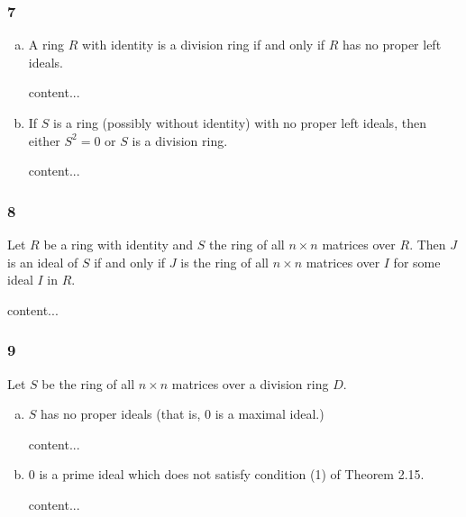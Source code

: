 \subsubsection*{7}
\begin{enumerate}[(a)]
	\item 
	\begin{graybox}
		A ring $R$ with identity is a division ring if and only if $R$ has no proper left ideals.
	\end{graybox}
	\begin{solution}
		content...
	\end{solution}
	
	\item
	\begin{graybox}
		If $S$ is a ring (possibly without identity) with no proper left ideals, then either $S^2 = 0$ or $S$ is a division ring.
	\end{graybox}
	\begin{solution}
		content...
	\end{solution}
\end{enumerate}

\subsubsection*{8}
\begin{graybox}
	Let $R$ be a ring with identity and $S$ the ring of all $n \times n$ matrices over $R$. Then $J$ is an ideal of $S$ if and only if $J$ is the ring of all $n \times n$ matrices over $I$ for some ideal $I$ in $R$.
\end{graybox}
\begin{solution}
	content...
\end{solution}


\subsubsection*{9}
\begin{graybox}
	Let $S$ be the ring of all $n \times n$ matrices over a division ring $D$.
\end{graybox}
\begin{enumerate}[(a)]
	\item 
	\begin{lightgraybox}
		$S$ has no proper ideals (that is, 0 is a maximal ideal.)
	\end{lightgraybox}
	\begin{solution}
		content...
	\end{solution}
	
	\item
	\begin{lightgraybox}
		0 is a prime ideal which does not satisfy condition (1) of Theorem 2.15.
	\end{lightgraybox}
	\begin{solution}
		content...
	\end{solution}
\end{enumerate}

